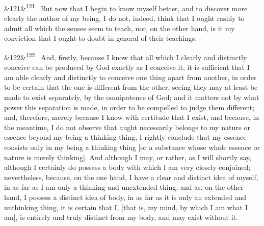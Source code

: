 \documentclass[12pt]{article}
\newcommand{\para}[1][]{\par\noindent\ifx&#1&\else\textsuperscript{\footnotesize #1}~\fi}
\begin{document}
\para[121] But now that I begin to know myself better, and to discover more clearly the author of my being, I do not, indeed, think that I ought rashly to admit all which the senses seem to teach, nor, on the other hand, is it my conviction that I ought to doubt in general of their teachings.

\para[122] And, firstly, because I know that all which I clearly and distinctly conceive can be produced by God exactly as I conceive it, it is sufficient that I am able clearly and distinctly to conceive one thing apart from another, in order to be certain that the one is different from the other, seeing they may at least be made to exist separately, by the omnipotence of God; and it matters not by what power this separation is made, in order to be compelled to judge them different; and, therefore, merely because I know with certitude that I exist, and because, in the meantime, I do not observe that aught necessarily belongs to my nature or essence beyond my being a thinking thing, I rightly conclude that my essence consists only in my being a thinking thing [or a substance whose whole essence or nature is merely thinking]. And although I may, or rather, as I will shortly say, although I certainly do possess a body with which I am very closely conjoined; nevertheless, because, on the one hand, I have a clear and distinct idea of myself, in as far as I am only a thinking and unextended thing, and as, on the other hand, I possess a distinct idea of body, in as far as it is only an extended and unthinking thing, it is certain that I, [that is, my mind, by which I am what I am], is entirely and truly distinct from my body, and may exist without it.
\end{document}
